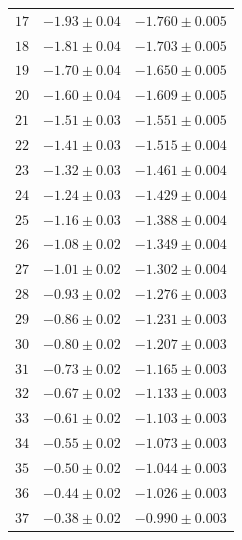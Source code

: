 \documentclass[12pt, a4paper]{article}
\begin{document}
\begin{longtable}{|c|c|c|}
    \footnotesize$17$ & \footnotesize$-1.93\pm0.04$&\footnotesize$-1.760\pm 0.005$ \\
    \footnotesize$18$ & \footnotesize$-1.81\pm0.04$&\footnotesize$-1.703\pm 0.005$ \\
    \footnotesize$19$ & \footnotesize$-1.70\pm0.04$&\footnotesize$-1.650\pm 0.005$ \\
    \footnotesize$20$ & \footnotesize$-1.60\pm0.04$&\footnotesize$-1.609\pm 0.005$ \\
    \footnotesize$21$ & \footnotesize$-1.51\pm0.03$&\footnotesize$-1.551\pm 0.005$ \\
    \footnotesize$22$ & \footnotesize$-1.41\pm0.03$&\footnotesize$-1.515\pm 0.004$ \\
    \footnotesize$23$ & \footnotesize$-1.32\pm0.03$&\footnotesize$-1.461\pm 0.004$ \\
    \footnotesize$24$ & \footnotesize$-1.24\pm0.03$&\footnotesize$-1.429\pm 0.004$ \\
    \footnotesize$25$ & \footnotesize$-1.16\pm0.03$&\footnotesize$-1.388\pm 0.004$ \\
    \footnotesize$26$ & \footnotesize$-1.08\pm0.02$&\footnotesize$-1.349\pm 0.004$ \\
    \footnotesize$27$ & \footnotesize$-1.01\pm0.02$&\footnotesize$-1.302\pm 0.004$ \\
    \footnotesize$28$ & \footnotesize$-0.93\pm0.02$&\footnotesize$-1.276\pm 0.003$ \\
    \footnotesize$29$ & \footnotesize$-0.86\pm0.02$&\footnotesize$-1.231\pm 0.003$ \\
    \footnotesize$30$ & \footnotesize$-0.80\pm0.02$&\footnotesize$-1.207\pm 0.003$ \\
    \footnotesize$31$ & \footnotesize$-0.73\pm0.02$&\footnotesize$-1.165\pm 0.003$ \\
    \footnotesize$32$ & \footnotesize$-0.67\pm0.02$&\footnotesize$-1.133\pm 0.003$ \\
    \footnotesize$33$ & \footnotesize$-0.61\pm0.02$&\footnotesize$-1.103\pm 0.003$ \\
    \footnotesize$34$ & \footnotesize$-0.55\pm0.02$&\footnotesize$-1.073\pm 0.003$ \\
    \footnotesize$35$ & \footnotesize$-0.50\pm0.02$&\footnotesize$-1.044\pm 0.003$\\
    \footnotesize$36$ & \footnotesize$-0.44\pm0.02$&\footnotesize$-1.026\pm 0.003$ \\
    \footnotesize$37$ & \footnotesize$-0.38\pm0.02$&\footnotesize$-0.990\pm 0.003$ \\

\end{longtable}
\end{document}
